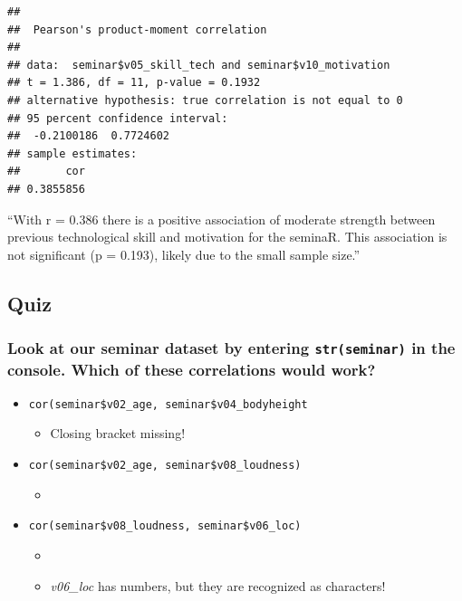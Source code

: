 \documentclass[
]{book}
\newenvironment{Shaded}{\begin{snugshade}}{\end{snugshade}}
\newcommand{\FunctionTok}[1]{\textcolor[rgb]{0.13,0.29,0.53}{\textbf{#1}}}
\newcommand{\NormalTok}[1]{#1}
\newcommand{\SpecialCharTok}[1]{\textcolor[rgb]{0.81,0.36,0.00}{\textbf{#1}}}
\providecommand{\tightlist}{%
  \setlength{\itemsep}{0pt}\setlength{\parskip}{0pt}}
\begin{document}
\begin{Shaded}
\end{Shaded}

\begin{verbatim}
## 
##  Pearson's product-moment correlation
## 
## data:  seminar$v05_skill_tech and seminar$v10_motivation
## t = 1.386, df = 11, p-value = 0.1932
## alternative hypothesis: true correlation is not equal to 0
## 95 percent confidence interval:
##  -0.2100186  0.7724602
## sample estimates:
##       cor 
## 0.3855856
\end{verbatim}

``With r = 0.386 there is a positive association of moderate strength between previous technological skill and motivation for the seminaR. This association is not significant (p = 0.193), likely due to the small sample size.''

\subsection{Quiz}\label{quiz}

\subsubsection{\texorpdfstring{Look at our seminar dataset by entering \texttt{str(seminar)} in the console. Which of these correlations would work?}{Look at our seminar dataset by entering str(seminar) in the console. Which of these correlations would work?}}\label{look-at-our-seminar-dataset-by-entering-strseminar-in-the-console.-which-of-these-correlations-would-work}

\begin{itemize}
\tightlist
\item
  \texttt{cor(seminar\$v02\_age,\ seminar\$v04\_bodyheight}

  \begin{itemize}
  \tightlist
  \item
    Closing bracket missing!
  \end{itemize}
\item
  \texttt{cor(seminar\$v02\_age,\ seminar\$v08\_loudness)}

  \begin{itemize}
  \tightlist
  \item
  \end{itemize}
\item
  \texttt{cor(seminar\$v08\_loudness,\ seminar\$v06\_loc)}

  \begin{itemize}
  \tightlist
  \item
  \item
    \emph{v06\_loc} has numbers, but they are recognized as characters!
  \end{itemize}
\end{itemize}
\end{document}
